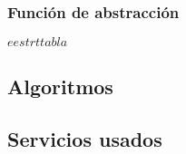 \subsubsection{Función de abstracción}

\begin{ABS}{$e$}{$estr$}{$t$}{$tabla$}
    \absfunc{}{}
\end{ABS}

\subsection{Algoritmos}

\subsection{Servicios usados}

